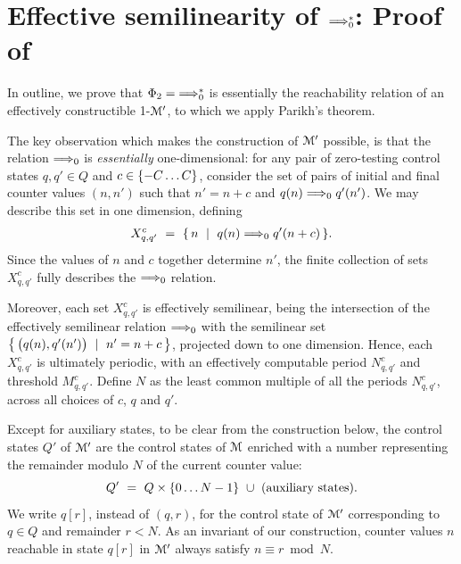 \section{Effective semilinearity of $\Longrightarrow_{0}^*$: Proof of } \label{sec:sl2}

    In outline,
    we prove that $\Phi_2 = {\Longrightarrow_{0}^*}$ is essentially the reachability
    relation of an effectively constructible 1-\cm $\mathcal{M}'$, to which we apply
    Parikh's theorem.

    \medskip

    The key observation which makes the construction of $\mathcal{M}'$ possible,
    is that the relation $\Longrightarrow_{0}$ is \emph{essentially} one-dimensional:
    for any pair of zero-testing control states $q,q'\in Q$ and
    $c\in\{-C\ldots C\}$, consider
    the set of pairs of initial and final counter values $(n,n')$ such that
    $n'=n+c$ and $q(n)\Longrightarrow_{0} q'(n')$.
    We may describe this set in one dimension, defining
    \begin{align}\label{eq:per2}
     X^c_{q,q'} \ = \ \{\,n \ \mid \ q(n)\Longrightarrow_{0} q'(n+c)\,\}.
    \end{align}
    Since the values of $n$ and $c$ together determine $n'$,
    the finite collection of sets $X^c_{q,q'}$ fully describes
    the $\Longrightarrow_{0}$ relation.

    Moreover, each set $X^c_{q,q'}$ is effectively semilinear,
    being the intersection of the effectively semilinear relation $\Longrightarrow_{0}$ 
    with the semilinear set $\bigl\{\,\bigl(q(n),q'(n')\bigr) \ \mid \ n'=n+c\,\bigr\}$,
    projected down to one dimension.
    Hence, each $X^c_{q,q'}$ is
    ultimately periodic, with an effectively computable 
    period $N^c_{q,q'}$ and threshold $M^c_{q,q'}$.
    Define $N$ as the least common multiple of all the periods $N^c_{q,q'}$,
    across all choices of $c$, $q$ and $q'$.

    Except for auxiliary states, to be clear from the construction below,
    the control states $Q'$ of $\mathcal{M}'$ are the control states of $\mathcal{M}$ 
    enriched with a number representing the remainder modulo $N$ of the 
    current counter value:
    \[
    Q' \ = \ Q \times \{0\ldots N-1\} \ \cup \ \text{(auxiliary states)}.
    \]
    We write $q[r]$, instead of $(q,r)$, 
    for the control state of $\mathcal{M}'$ corresponding 
    to $q\in Q$ and remainder $r<N$.
    As an invariant of our construction, 
    counter values $n$ reachable in state $q[r]$ in $\mathcal{M}'$ always satisfy 
    $n\equiv r \bmod N$.

